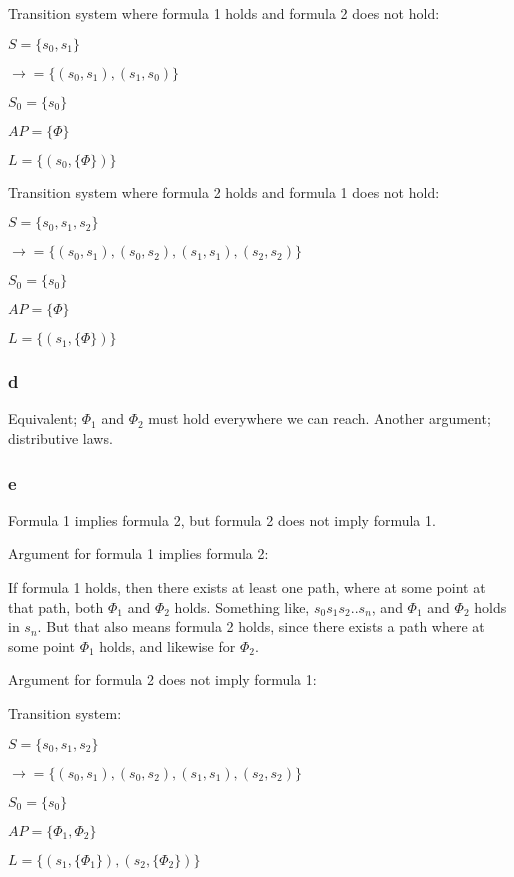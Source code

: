 Transition system where formula 1 holds and formula 2 does not hold:

$S = \{s_0, s_1\}$

$\rightarrow = \{
  (s_0, s_1), (s_1, s_0)
\}$

$S_0 = \{s_0\}$

$AP = \{\Phi\}$

$L = \{
  (s_0, \{\Phi\})
\}$

Transition system where formula 2 holds and formula 1 does not hold:

$S = \{s_0, s_1, s_2\}$

$\rightarrow = \{
  (s_0, s_1), (s_0, s_2),
  (s_1, s_1),
  (s_2, s_2)
\}$

$S_0 = \{s_0\}$

$AP = \{\Phi\}$

$L = \{
  (s_1, \{\Phi\})
\}$

\subsubsection{d}

Equivalent; $\Phi_1$ and $\Phi_2$ must hold everywhere we can reach.
Another argument; distributive laws.

\subsubsection{e}

Formula 1 implies formula 2, but formula 2 does not imply formula 1.

Argument for formula 1 implies formula 2:

If formula 1 holds, then there exists at least one path,
where at some point at that path, both $\Phi_1$ and $\Phi_2$ holds.
Something like, $s_0s_1s_2..s_n$, and $\Phi_1$ and $\Phi_2$ holds in $s_n$.
But that also means formula 2 holds, since there exists a path
where at some point $\Phi_1$ holds, and likewise for $\Phi_2$.

Argument for formula 2 does not imply formula 1:

Transition system:

$S = \{s_0, s_1, s_2\}$

$\rightarrow = \{
  (s_0, s_1), (s_0, s_2),
  (s_1, s_1),
  (s_2, s_2)
\}$

$S_0 = \{s_0\}$

$AP = \{\Phi_1, \Phi_2\}$

$L = \{
  (s_1, \{\Phi_1\}),
  (s_2, \{\Phi_2\})
\}$


